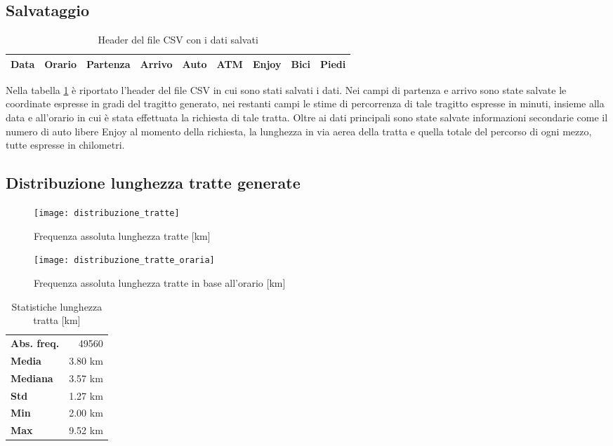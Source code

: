 \subsection{Salvataggio}

\begin{table}[H]
\centering
\begin{tabular}{ | c | c | c | c | c | c | c | c | c | }
\hline
Data & Orario & Partenza & Arrivo & Auto & ATM & Enjoy & Bici & Piedi \\
\hline
\end{tabular}
\caption{Header del file CSV con i dati salvati}
\label{table:7}
\end{table}

Nella tabella \ref{table:7} è riportato l'header del file CSV in cui sono stati salvati i dati. Nei campi di partenza e arrivo sono state salvate le coordinate espresse in gradi del tragitto generato, nei restanti campi le stime di percorrenza di tale tragitto espresse in minuti, insieme alla data e all'orario in cui è stata effettuata la richiesta di tale tratta. Oltre ai dati principali sono state salvate informazioni secondarie come il numero di auto libere Enjoy al momento della richiesta, la lunghezza in via aerea della tratta e quella totale del percorso di ogni mezzo, tutte espresse in chilometri.

\subsection{Distribuzione lunghezza tratte generate}

\begin{figure}[H]
\texttt{[image: distribuzione\_tratte]}
\caption{Frequenza assoluta lunghezza tratte [km]}
\label{image:2}
\end{figure}

\begin{figure}[H]
	\texttt{[image: distribuzione\_tratte\_oraria]}
	\caption{Frequenza assoluta lunghezza tratte in base all'orario [km]}
	\label{image:19}
\end{figure}

\begin{table}[H]
\centering
\begin{tabular}{ | l r | }
\hline
\textbf{Abs. freq.} & 49560 \\
\textbf{Media} & 3.80 km \\
\textbf{Mediana} & 3.57 km \\
\textbf{Std} & 1.27 km \\
\textbf{Min} & 2.00 km \\
\textbf{Max} & 9.52 km \\
\hline
\end{tabular}
\caption{Statistiche lunghezza tratta [km]}
\label{table:2}
\end{table}


